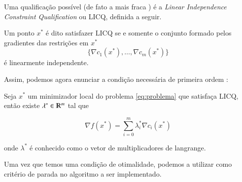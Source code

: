 Uma qualificação possível (de fato a mais fraca \citep{Wachsmuth201378}) é a
\emph{Linear Independence Constraint Qualification} ou LICQ, definida a seguir.

\begin{definition}
    Um ponto $x^*$ é dito satisfazer LICQ se e somente o conjunto formado pelos
    gradientes das restrições em $x^*$
    $$ \{ \nabla c_1(x^*), \dots, \nabla c_m(x^*)\} $$
    é linearmente independente.
\end{definition}

Assim, podemos agora enunciar a condição necessária de primeira ordem \citep{Friedlander94}:

\begin{theorem}
    Seja $x^*$ um minimizador local do problema \ref{eq:problema} que satisfaça LICQ,
    então existe $\lambda^* \in \varmathbb{R}^m$ tal que

    \begin{equation}
        \nabla f(x^*) = \sum_{i = 0}^{m} \lambda_i^* \nabla c_i(x^*)
    \end{equation}

    onde $\lambda^*$ é conhecido como o vetor de multiplicadores de langrange.
\end{theorem}

Uma vez que temos uma condição de otimalidade, podemos a utilizar como critério
de parada no algoritmo a ser implementado.
